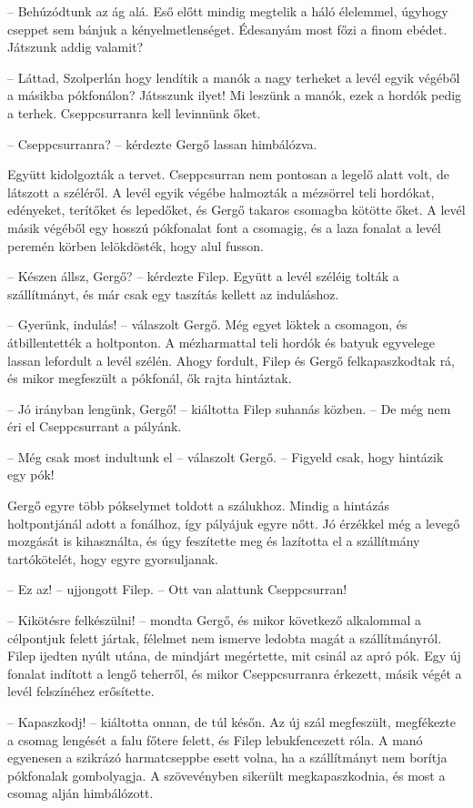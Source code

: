 \documentclass[10pt]{memoir}
\begin{document}
-- Behúzódtunk az ág alá. Eső előtt mindig megtelik a háló élelemmel, úgyhogy
cseppet sem bánjuk a kényelmetlenséget. Édesanyám most főzi a finom ebédet.
Játszunk addig valamit?

-- Láttad, Szolperlán hogy lendítik a manók a nagy terheket a levél egyik
végéből a másikba pókfonálon? Játsszunk ilyet! Mi leszünk a manók, ezek a
hordók pedig a terhek. Cseppcsurranra kell levinnünk őket.

-- Cseppcsurranra? -- kérdezte Gergő lassan himbálózva.

Együtt kidolgozták a tervet. Cseppcsurran nem pontosan a legelő alatt volt, de
látszott a széléről. A levél egyik végébe halmozták a mézsörrel teli hordókat,
edényeket, terítőket és lepedőket, és Gergő takaros csomagba kötötte őket. A
levél másik végéből egy hosszú pókfonalat font a csomagig, és a laza fonalat a
levél peremén körben lelökdösték, hogy alul fusson.

-- Készen állsz, Gergő? -- kérdezte Filep. Együtt a levél széléig tolták a
szállítmányt, és már csak egy taszítás kellett az induláshoz.

-- Gyerünk, indulás! -- válaszolt Gergő. Még egyet löktek a csomagon, és
átbillentették a holtponton. A mézharmattal teli hordók és batyuk egyvelege
lassan lefordult a levél szélén. Ahogy fordult, Filep és Gergő felkapaszkodtak
rá, és mikor megfeszült a pókfonál, ők rajta hintáztak.

-- Jó irányban lengünk, Gergő! -- kiáltotta Filep suhanás közben. -- De még
nem éri el Cseppcsurrant a pályánk.

-- Még csak most indultunk el -- válaszolt Gergő. -- Figyeld csak, hogy
hintázik egy pók!

Gergő egyre több pókselymet toldott a szálukhoz. Mindig a hintázás
holtpontjánál adott a fonálhoz, így pályájuk egyre nőtt. Jó érzékkel még a
levegő mozgását is kihasználta, és úgy feszítette meg és lazította el a
szállítmány tartókötelét, hogy egyre gyorsuljanak.

-- Ez az! -- ujjongott Filep. -- Ott van alattunk Cseppcsurran!

-- Kikötésre felkészülni! -- mondta Gergő, és mikor következő alkalommal a
célpontjuk felett jártak, félelmet nem ismerve ledobta magát a szállítmányról.
Filep ijedten nyúlt utána, de mindjárt megértette, mit csinál az apró pók. Egy
új fonalat indított a lengő teherről, és mikor Cseppcsurranra érkezett, másik
végét a levél felszínéhez erősítette.

-- Kapaszkodj! -- kiáltotta onnan, de túl későn. Az új szál megfeszült,
megfékezte a csomag lengését a falu főtere felett, és Filep lebukfencezett
róla. A manó egyenesen a szikrázó harmatcseppbe esett volna, ha a szállítmányt
nem borítja pókfonalak gombolyagja. A szövevényben sikerült megkapaszkodnia, és
most a csomag alján himbálózott.
\end{document}
